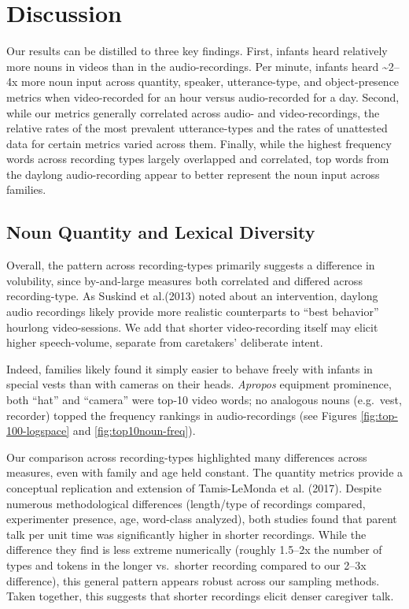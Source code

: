 \documentclass[man]{apa6}
\theoremstyle{definition}
\theoremstyle{definition}
\theoremstyle{definition}
\theoremstyle{remark}
\begin{document}
\section{Discussion}\label{discussion}

Our results can be distilled to three key findings. First, infants heard
relatively more nouns in videos than in the audio-recordings. Per
minute, infants heard \textasciitilde{}2--4x more noun input across
quantity, speaker, utterance-type, and object-presence metrics when
video-recorded for an hour versus audio-recorded for a day. Second,
while our metrics generally correlated across audio- and
video-recordings, the relative rates of the most prevalent
utterance-types and the rates of unattested data for certain metrics
varied across them. Finally, while the highest frequency words across
recording types largely overlapped and correlated, top words from the
daylong audio-recording appear to better represent the noun input across
families.

\subsection{Noun Quantity and Lexical
Diversity}\label{noun-quantity-and-lexical-diversity}

Overall, the pattern across recording-types primarily suggests a
difference in volubility, since by-and-large measures both correlated
and differed across recording-type. As Suskind et al.(2013) noted about
an intervention, daylong audio recordings likely provide more realistic
counterparts to \enquote{best behavior} hourlong video-sessions. We add
that shorter video-recording itself may elicit higher speech-volume,
separate from caretakers' deliberate intent.

Indeed, families likely found it simply easier to behave freely with
infants in special vests than with cameras on their heads.
\emph{Apropos} equipment prominence, both \enquote{hat} and
\enquote{camera} were top-10 video words; no analogous nouns (e.g.~vest,
recorder) topped the frequency rankings in audio-recordings (see Figures
\ref{fig:top-100-logspace} and \ref{fig:top10noun-freq}).

Our comparison across recording-types highlighted many differences
across measures, even with family and age held constant. The quantity
metrics provide a conceptual replication and extension of Tamis-LeMonda
et al. (2017). Despite numerous methodological differences (length/type
of recordings compared, experimenter presence, age, word-class
analyzed), both studies found that parent talk per unit time was
significantly higher in shorter recordings. While the difference they
find is less extreme numerically (roughly 1.5--2x the number of types
and tokens in the longer vs.~shorter recording compared to our 2--3x
difference), this general pattern appears robust across our sampling
methods. Taken together, this suggests that shorter recordings elicit
denser caregiver talk.
\end{document}
